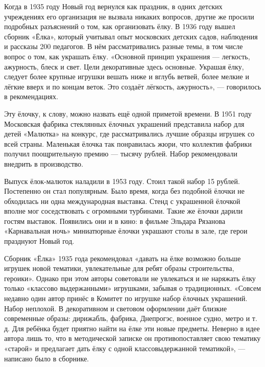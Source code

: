 \begin{zznagolos} 
Когда в 1935 году Новый год вернулся как праздник, в одних детских учреждениях
его организация не вызвала никаких вопросов, другие же просили подробных
разъяснений о том, как организовать ёлку. В 1936 году вышел сборник «Ёлка»,
который учитывал опыт московских детских садов, наблюдения и рассказы 200
педагогов. В нём рассматривались разные темы, в том числе вопрос о том, как
украшать ёлку. «Основной принцип украшения — легкость, ажурность, блеск и свет.
Цели декоративные здесь основные. Украшая ёлку, следует более крупные игрушки
вешать ниже и вглубь ветвей, более мелкие и лёгкие вверх и по концам веток. Это
создаёт лёгкость, ажурность», — говорилось в рекомендациях.
\end{zznagolos}

Эту ёлочку, к слову, можно назвать ещё одной приметой времени. В 1951 году
Московская фабрика стеклянных ёлочных украшений представила набор для детей
«Малютка» на конкурс, где рассматривались лучшие образцы игрушек со всей
страны. Маленькая ёлочка так понравилась жюри, что коллектив фабрики получил
поощрительную премию — тысячу рублей. Набор рекомендовали внедрить в
производство.


Выпуск ёлок-малюток наладили в 1953 году. Стоил такой набор 15 рублей.
Постепенно он стал популярным. Было время, когда без подобной ёлочки не
обходилась ни одна международная выставка. Стенд с украшенной ёлочкой вполне
мог соседствовать с огромными турбинами. Такие же ёлочки дарили гостям
выставок. Появились они и в кино: в фильме Эльдара Рязанова «Карнавальная ночь»
миниатюрные ёлочки украшают столы в зале, где герои празднуют Новый год.

\begin{zznagolos}
Сборник «Ёлка» 1935 года рекомендовал «давать на ёлке возможно больше игрушек
новой тематики, увлекательные для ребят образы строительства, героики». Однако
при этом авторы советовали не увлекаться и не наряжать ёлку только «классово
выдержанными» игрушками, забывая о традиционных. «Совсем недавно один автор
принёс в Комитет по игрушке набор ёлочных украшений. Набор неплохой. В
декоративном и световом оформлении даёт близкие современные образы: дирижабль,
фабрика, Днепрогэс, военное судно, метро и т. д. Для ребёнка будет приятно
найти на ёлке эти новые предметы. Неверно в идее автора лишь то, что в
методической записке он противопоставляет свою тематику «старой» и предлагает
дать ёлку с одной классовыдержанной тематикой», — написано было в сборнике. 	
\end{zznagolos}

